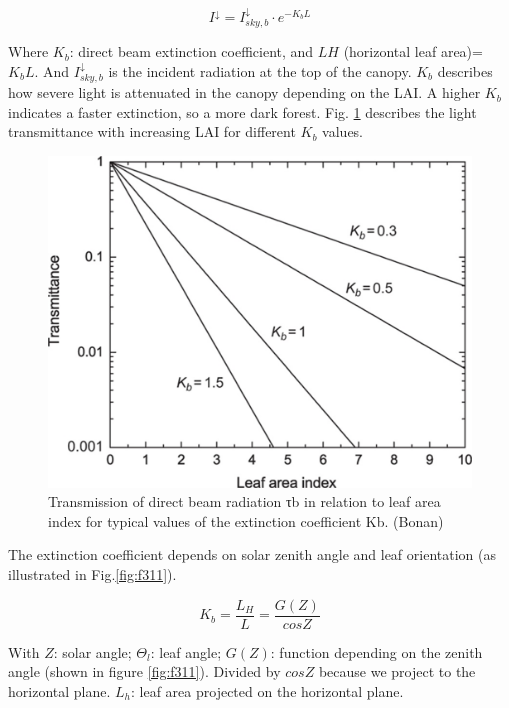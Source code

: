 \documentclass[
  12pt,
  oneside]{book}
\begin{document}
\[
I^{\downarrow} = I^{\downarrow}_{sky,b}\cdot e^{-K_bL}
\]

Where \(K_b\): direct beam extinction coefficient, and \(LH\) (horizontal leaf area)= \(K_b L\). And \(I^{\downarrow}_{sky,b}\) is the incident radiation at the top of the canopy. \(K_b\) describes how severe light is attenuated in the canopy depending on the LAI. A higher \(K_b\) indicates a faster extinction, so a more dark forest. Fig. \ref{fig:f310} describes the light transmittance with increasing LAI for different \(K_b\) values.

\begin{figure}

{\centering \includegraphics[width=0.8\linewidth]{figures/chap3/f310_Kb} 

}

\caption{Transmission of direct beam radiation τb in relation to leaf area index for typical values of the extinction coefficient Kb. (Bonan)}\label{fig:f310}
\end{figure}

The extinction coefficient depends on solar zenith angle and leaf orientation (as illustrated in Fig.\ref{fig:f311}).

\[
K_b = \frac{L_H}{L} = \frac{G(Z)}{cosZ}
\]

With \(Z\): solar angle; \(\Theta_l\): leaf angle; \(G(Z)\): function depending on the zenith angle (shown in figure \ref{fig:f311}). Divided by \(cosZ\) because we project to the horizontal plane. \(L_h\): leaf area projected on the horizontal plane.
\end{document}
